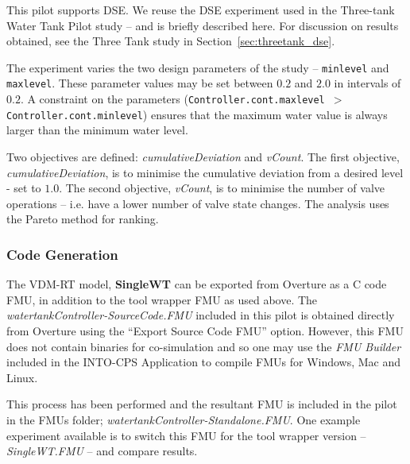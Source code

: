 This pilot supports DSE. We reuse the DSE experiment used in the Three-tank Water Tank Pilot study -- and is briefly described here. For discussion on results obtained, see the Three Tank study in Section~\ref{sec:threetank_dse}.

The experiment varies the two design parameters of the study -- \texttt{minlevel} and \texttt{maxlevel}. These parameter values may be set between $0.2$ and $2.0$ in intervals of $0.2$. A constraint on the parameters (\texttt{{Controller}.cont.maxlevel $>$ {Controller}.cont.minlevel}) ensures that the maximum water value is always larger than the minimum water level. 

Two objectives are defined: \textit{cumulativeDeviation} and \textit{vCount}. The first objective, \textit{cumulativeDeviation}, is to minimise the cumulative deviation from a desired level - set to $1.0$. The second objective, \textit{vCount}, is to minimise the number of valve operations -- i.e. have a lower number of valve state changes. The analysis uses the Pareto method for ranking.

\subsubsection{Code Generation}

The VDM-RT model, \textbf{SingleWT} can be exported from Overture as a C code FMU, in addition to the tool wrapper FMU as used above. The \emph{watertankController-SourceCode.FMU} included in this pilot is obtained directly from Overture using the ``Export Source Code FMU'' option. However, this FMU does not contain binaries for co-simulation and so one may use the \emph{FMU Builder} included in the INTO-CPS Application to compile FMUs for Windows, Mac and Linux. 

This process has been performed and the resultant FMU is included in the pilot in the FMUs folder; \emph{watertankController-Standalone.FMU}. One example experiment available is to switch this FMU for the tool wrapper version -- \emph{SingleWT.FMU} -- and compare results.
